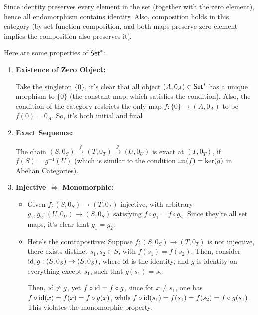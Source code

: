 \documentclass{article}
\begin{document}
Since identity preserves every element in the set (together with the zero element), hence all endomorphism contains identity. Also, composition holds in this category (by set function composition, and both maps preserve zero element implies the composition also preserves it).

\hfil

Here are some properties of $\mathsf{Set}^*$:

\begin{enumerate}
    \item \textbf{Existence of Zero Object:} 
    
    Take the singleton $\{0\}$, it's clear that all object $(A,0_A)\in \mathsf{Set}^*$ has a unique morphism to $\{0\}$ (the constant map, which satisfies the condition). Also, the condition of the category restricts the only map $f:\{0\}\rightarrow (A,0_A)$ to be $f(0)= 0_A$. So, it's both initial and final
    
    \hfil

    \item \textbf{Exact Sequence:} 
    
    The chain $(S,0_S)\xrightarrow{f} (T,0_T)\xrightarrow{g} (U,0_U)$ is exact at $(T,0_T)$, if $f(S) = g^{-1}(U)$ (which is similar to the condition $\mathrm{im}(f)=\ker(g)$ in Abelian Categories).
    
    \hfil

    \item \textbf{Injective $\iff$ Monomorphic:}
    
    \begin{itemize}
        \item[$\implies$:] Given $f:(S,0_S)\rightarrow (T,0_T)$ injective, with arbitrary $g_1,g_2:(U,0_U)\rightarrow (S,0_S)$ satisfying $f \circ g_1=f\circ g_2$. Since they're all set maps, it's clear that $g_1=g_2$.
        \item[$\impliedby$:] Here's the contrapositive: Suppose $f:(S,0_S)\rightarrow (T,0_T)$ is not injective, there exists distinct $s_1,s_2\in S$, with $f(s_1)=f(s_2)$. Then, consider $\mathrm{id}, g:(S,0_S)\rightarrow (S,0_S)$, where $\mathrm{id}$ is the identity, and $g$ is identity on everything except $s_1$, such that $g(s_1)=s_2$. 
        
        Then, $\mathrm{id}\neq g$, yet $f\circ \mathrm{id}=f\circ g$, since for $x\neq s_1$, one has $f\circ \mathrm{id}(x)=f(x)=f\circ g(x)$, while $f\circ \mathrm{id}(s_1)=f(s_1)=f(s_2)=f\circ g(s_1)$. This violates the monomorphic property.
    \end{itemize}


\end{enumerate}
\end{document}
